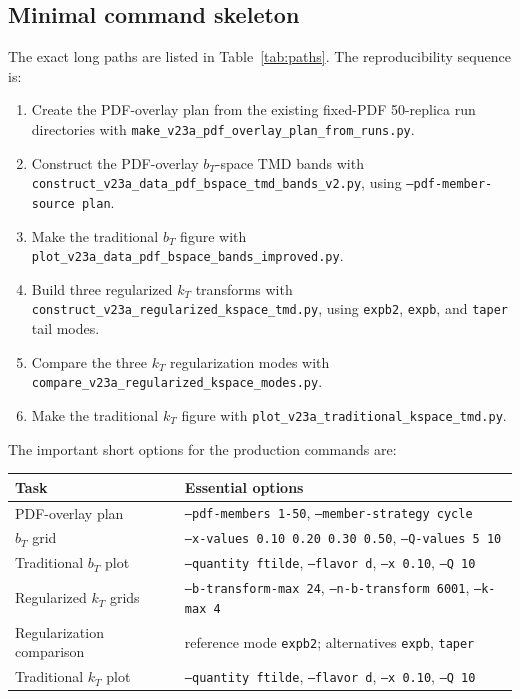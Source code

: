 \documentclass[11pt]{article}
\begin{document}
\subsection{Minimal command skeleton}

The exact long paths are listed in Table~\ref{tab:paths}.  The reproducibility sequence is:
\begin{enumerate}[leftmargin=2em]
  \item Create the PDF-overlay plan from the existing fixed-PDF 50-replica run directories with \texttt{make\_v23a\_pdf\_overlay\_plan\_from\_runs.py}.
  \item Construct the PDF-overlay \(b_T\)-space TMD bands with \texttt{construct\_v23a\_data\_pdf\_bspace\_tmd\_bands\_v2.py}, using \texttt{--pdf-member-source plan}.
  \item Make the traditional \(b_T\) figure with \texttt{plot\_v23a\_data\_pdf\_bspace\_bands\_improved.py}.
  \item Build three regularized \(k_T\) transforms with \texttt{construct\_v23a\_regularized\_kspace\_tmd.py}, using \texttt{expb2}, \texttt{expb}, and \texttt{taper} tail modes.
  \item Compare the three \(k_T\) regularization modes with \texttt{compare\_v23a\_regularized\_kspace\_modes.py}.
  \item Make the traditional \(k_T\) figure with \texttt{plot\_v23a\_traditional\_kspace\_tmd.py}.
\end{enumerate}

The important short options for the production commands are:
\begin{center}
\begin{tabular}{ll}
\toprule
Task & Essential options \\
\midrule
PDF-overlay plan & \texttt{--pdf-members 1-50}, \texttt{--member-strategy cycle} \\
\(b_T\) grid & \texttt{--x-values 0.10 0.20 0.30 0.50}, \texttt{--Q-values 5 10} \\
Traditional \(b_T\) plot & \texttt{--quantity ftilde}, \texttt{--flavor d}, \texttt{--x 0.10}, \texttt{--Q 10} \\
Regularized \(k_T\) grids & \texttt{--b-transform-max 24}, \texttt{--n-b-transform 6001}, \texttt{--k-max 4} \\
Regularization comparison & reference mode \texttt{expb2}; alternatives \texttt{expb}, \texttt{taper} \\
Traditional \(k_T\) plot & \texttt{--quantity ftilde}, \texttt{--flavor d}, \texttt{--x 0.10}, \texttt{--Q 10} \\
\bottomrule
\end{tabular}
\end{center}
\end{document}
